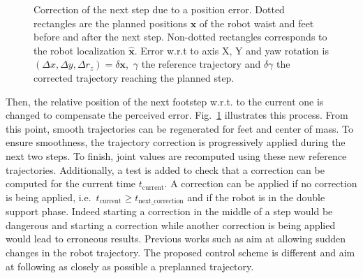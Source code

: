 \begin{figure}[ht!]
\begin{center}
  \end{center}
  \caption{Correction of the next step due to a position error. Dotted
    rectangles are the planned positions $\mathbf{x}$ of the robot
    waist and feet before and after the next step. Non-dotted
    rectangles corresponds to the robot localization
    $\mathbf{\hat{x}}$. Error w.r.t to axis X, Y and yaw rotation is
    \mbox{$(\Delta x, \Delta y, \Delta r_z) = \delta \mathbf{x}$,
      $\gamma$} the reference trajectory and $\delta \gamma$ the
    corrected trajectory reaching the planned
    step. \label{fig:footstepreplan}}
\end{figure}
%
%
%
Then, the relative position of the next footstep w.r.t. to the current
one is changed to compensate the perceived
error. Fig.~\ref{fig:footstepreplan} illustrates this process.
%
%
From this point, smooth trajectories can be regenerated for feet and
center of mass. To ensure smoothness, the trajectory correction is
progressively applied during the next two steps. To finish, joint
values are recomputed using these new reference trajectories.
%
%
%
Additionally, a test is added to check that a correction can be
computed for the current time $t_{\text{current}}$. A correction can
be applied if no correction is being applied,
i.e.\ \mbox{$t_{\text{current}} \geq t_{\text{next\_correction}}$} and if the
robot is in the double support phase. Indeed starting a correction in
the middle of a step would be dangerous and starting a correction
while another correction is being applied would lead to erroneous
results.
%
%
Previous works such as \cite{04humanoids.harada, 07icra.morisawa} aim
at allowing sudden changes in the robot trajectory. The proposed
control scheme is different and aim at following as closely as
possible a preplanned trajectory.
%
%
